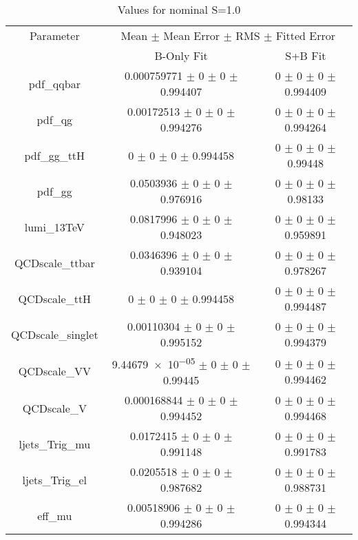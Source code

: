 \begin{table}
\centering
\caption{Values for nominal S=1.0}
\begin{tabular}{ccc}
\toprule
Parameter 	& \multicolumn{2}{c}{Mean $\pm$ Mean Error $\pm$ RMS $\pm$ Fitted Error}\\
 	& B-Only Fit & S+B Fit\\
\midrule
pdf\_qqbar 	& \num{0.000759771} $\pm$ \num{0} $\pm$ \num{0} $\pm$ \num{0.994407} 	& \num{0} $\pm$ \num{0} $\pm$ \num{0} $\pm$ \num{0.994409}\\
pdf\_qg 	& \num{0.00172513} $\pm$ \num{0} $\pm$ \num{0} $\pm$ \num{0.994276} 	& \num{0} $\pm$ \num{0} $\pm$ \num{0} $\pm$ \num{0.994264}\\
pdf\_gg\_ttH 	& \num{0} $\pm$ \num{0} $\pm$ \num{0} $\pm$ \num{0.994458} 	& \num{0} $\pm$ \num{0} $\pm$ \num{0} $\pm$ \num{0.99448}\\
pdf\_gg 	& \num{0.0503936} $\pm$ \num{0} $\pm$ \num{0} $\pm$ \num{0.976916} 	& \num{0} $\pm$ \num{0} $\pm$ \num{0} $\pm$ \num{0.98133}\\
lumi\_13TeV 	& \num{0.0817996} $\pm$ \num{0} $\pm$ \num{0} $\pm$ \num{0.948023} 	& \num{0} $\pm$ \num{0} $\pm$ \num{0} $\pm$ \num{0.959891}\\
QCDscale\_ttbar 	& \num{0.0346396} $\pm$ \num{0} $\pm$ \num{0} $\pm$ \num{0.939104} 	& \num{0} $\pm$ \num{0} $\pm$ \num{0} $\pm$ \num{0.978267}\\
QCDscale\_ttH 	& \num{0} $\pm$ \num{0} $\pm$ \num{0} $\pm$ \num{0.994458} 	& \num{0} $\pm$ \num{0} $\pm$ \num{0} $\pm$ \num{0.994487}\\
QCDscale\_singlet 	& \num{0.00110304} $\pm$ \num{0} $\pm$ \num{0} $\pm$ \num{0.995152} 	& \num{0} $\pm$ \num{0} $\pm$ \num{0} $\pm$ \num{0.994379}\\
QCDscale\_VV 	& \num{9.44679e-05} $\pm$ \num{0} $\pm$ \num{0} $\pm$ \num{0.99445} 	& \num{0} $\pm$ \num{0} $\pm$ \num{0} $\pm$ \num{0.994462}\\
QCDscale\_V 	& \num{0.000168844} $\pm$ \num{0} $\pm$ \num{0} $\pm$ \num{0.994452} 	& \num{0} $\pm$ \num{0} $\pm$ \num{0} $\pm$ \num{0.994468}\\
ljets\_Trig\_mu 	& \num{0.0172415} $\pm$ \num{0} $\pm$ \num{0} $\pm$ \num{0.991148} 	& \num{0} $\pm$ \num{0} $\pm$ \num{0} $\pm$ \num{0.991783}\\
ljets\_Trig\_el 	& \num{0.0205518} $\pm$ \num{0} $\pm$ \num{0} $\pm$ \num{0.987682} 	& \num{0} $\pm$ \num{0} $\pm$ \num{0} $\pm$ \num{0.988731}\\
eff\_mu 	& \num{0.00518906} $\pm$ \num{0} $\pm$ \num{0} $\pm$ \num{0.994286} 	& \num{0} $\pm$ \num{0} $\pm$ \num{0} $\pm$ \num{0.994344}\\

\end{tabular}
\end{table}
